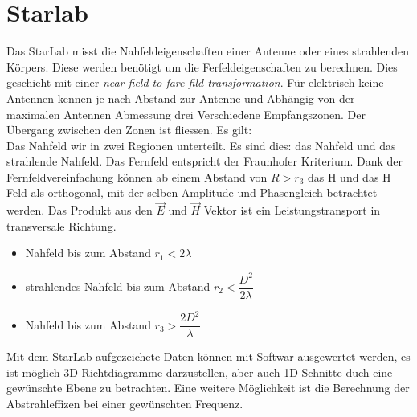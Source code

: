 	\section{Starlab}
	Das StarLab misst die Nahfeldeigenschaften einer Antenne oder eines strahlenden Körpers. Diese werden benötigt um die Ferfeldeigenschaften zu berechnen. Dies geschieht mit einer \textit{near field to fare fild transformation}. Für elektrisch keine Antennen kennen je nach Abstand zur Antenne und Abhängig von der maximalen Antennen Abmessung drei Verschiedene Empfangszonen. Der Übergang zwischen den Zonen ist fliessen. Es gilt:\\  
	Das Nahfeld wir in zwei Regionen unterteilt. Es sind dies: das Nahfeld und das strahlende Nahfeld. Das Fernfeld entspricht der Fraunhofer Kriterium. Dank der Fernfeldvereinfachung können ab einem Abstand von $R>r_3$ das H und das H Feld als orthogonal, mit der selben Amplitude und Phasengleich betrachtet  werden. Das Produkt aus den $\vec{E}$ und $\vec{H}$ Vektor ist ein Leistungstransport in transversale Richtung.
	
	\begin{itemize}
	\item Nahfeld bis zum Abstand $r_1<2\lambda$
	\item strahlendes Nahfeld bis zum Abstand $r_2<\dfrac{D^2}{2\lambda}$
	\item Nahfeld bis zum Abstand $r_3>\dfrac{2D^2}{\lambda}$
\end{itemize}	 
Mit dem StarLab aufgezeichete Daten können mit Softwar ausgewertet werden, es ist möglich 3D Richtdiagramme darzustellen, aber auch 1D Schnitte duch eine gewünschte Ebene zu betrachten. Eine weitere Möglichkeit ist die Berechnung der Abstrahleffizen bei einer gewünschten Frequenz.
